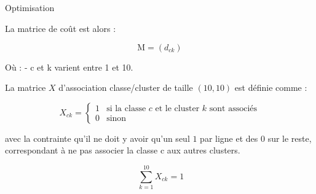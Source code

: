 \documentclass[
]{article}
\newenvironment{Shaded}{\begin{snugshade}}{\end{snugshade}}
\newcommand{\AttributeTok}[1]{\textcolor[rgb]{0.13,0.29,0.53}{#1}}
\newcommand{\DecValTok}[1]{\textcolor[rgb]{0.00,0.00,0.81}{#1}}
\newcommand{\FunctionTok}[1]{\textcolor[rgb]{0.13,0.29,0.53}{\textbf{#1}}}
\newcommand{\NormalTok}[1]{#1}
\newcommand{\OtherTok}[1]{\textcolor[rgb]{0.56,0.35,0.01}{#1}}
\newcommand{\SpecialCharTok}[1]{\textcolor[rgb]{0.81,0.36,0.00}{\textbf{#1}}}
\begin{document}
\hypertarget{section-4}{%
\subsection{}\label{section-4}}

\begin{Shaded}
\end{Shaded}

\hypertarget{section-5}{%
\subsection{}\label{section-5}}

Optimisation

La matrice de coût est alors :

\[
\text{M} = (d_{ck}) 
\]

Où : - c et k varient entre 1 et 10.

La matrice \(X\) d'association classe/cluster de taille \((10,10)\) est
définie comme :

\[
X_{ck} = 
\begin{cases} 
1 & \text{si la classe } c \text{ et le cluster } k \text{ sont associés} \\
0 & \text{sinon} 
\end{cases}
\]

avec la contrainte qu'il ne doit y avoir qu'un seul \(1\) par ligne et
des \(0\) sur le reste, correspondant à ne pas associer la classe c aux
autres clusters.

\[
\ \sum_{k=1}^{10} X_{ck} = 1
\]

\hypertarget{section-6}{%
\subsection{}\label{section-6}}
\end{document}
